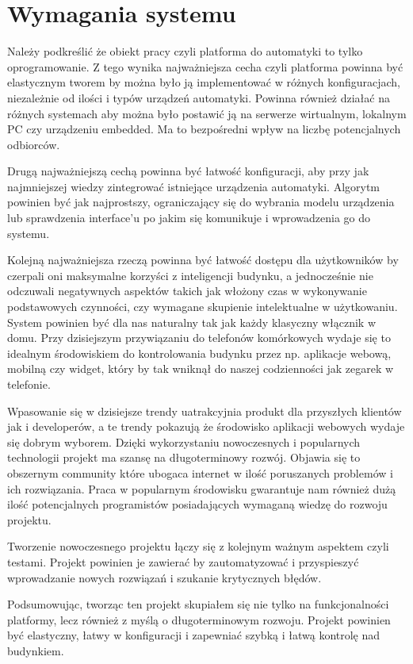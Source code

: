 \chapter{Wymagania systemu}
Należy podkreślić że obiekt pracy czyli platforma do automatyki to tylko oprogramowanie. Z tego wynika najważniejsza cecha czyli platforma powinna być elastycznym tworem by można było ją implementować w różnych konfiguracjach,  niezależnie od ilości i typów urządzeń automatyki. Powinna również działać na różnych systemach aby można było postawić ją na serwerze wirtualnym, lokalnym PC czy urządzeniu embedded. Ma to bezpośredni wpływ na liczbę potencjalnych odbiorców. \par Drugą najważniejszą cechą powinna być łatwość konfiguracji, aby przy jak najmniejszej wiedzy zintegrować istniejące urządzenia automatyki. Algorytm powinien być jak najprostszy, ograniczający się do wybrania modelu urządzenia lub sprawdzenia interface'u po jakim się komunikuje i wprowadzenia go do systemu. 
\par Kolejną najważniejsza rzeczą powinna być łatwość dostępu dla użytkowników by czerpali oni maksymalne korzyści z inteligencji budynku, a jednocześnie nie odczuwali negatywnych aspektów takich jak włożony czas w wykonywanie podstawowych czynności, czy wymagane skupienie intelektualne w użytkowaniu. System powinien być dla nas naturalny tak jak każdy klasyczny włącznik w domu. Przy dzisiejszym przywiązaniu do telefonów komórkowych wydaje się to idealnym środowiskiem do kontrolowania budynku przez np. aplikacje webową, mobilną czy widget, który by tak wniknął do naszej codzienności jak zegarek w telefonie. \par
Wpasowanie się w dzisiejsze trendy uatrakcyjnia produkt dla przyszłych klientów jak i developerów, a te trendy pokazują że środowisko aplikacji webowych wydaje się dobrym wyborem. Dzięki wykorzystaniu nowoczesnych i popularnych technologii projekt ma szansę na długoterminowy rozwój. Objawia się to obszernym community które ubogaca internet w ilość poruszanych problemów i ich rozwiązania. Praca w popularnym środowisku gwarantuje nam również dużą ilość potencjalnych programistów posiadających wymaganą wiedzę do rozwoju projektu.
\par Tworzenie nowoczesnego projektu łączy się z kolejnym ważnym aspektem czyli testami. Projekt powinien je zawierać by zautomatyzować i przyspieszyć wprowadzanie nowych rozwiązań i szukanie krytycznych błędów. 
\par Podsumowując, tworząc ten projekt skupiałem się nie tylko na funkcjonalności platformy, lecz również z myślą o długoterminowym rozwoju. Projekt powinien być elastyczny, łatwy w konfiguracji i zapewniać szybką i łatwą kontrolę nad budynkiem. 
